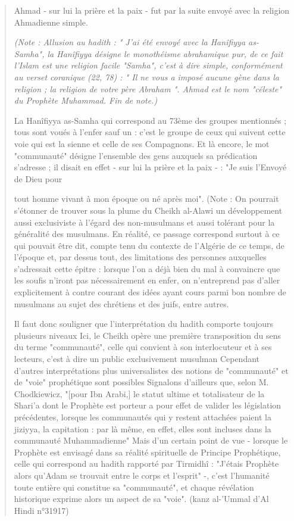 \begin{quote}
Ahmad - sur lui la prière et la paix - fut par la suite envoyé avec la
religion Ahmadienne simple.

\emph{(Note : Allusion au hadith : " J'ai été envoyé avec la Hanîfiyya
as- Samha", la Hanîfiyya désigne le monothéisme abrahamique pur, de ce
fait l'Islam est une religion facile "Samha", c'est à dire simple,
conformément au verset coranique (22, 78) : " Il ne vous a imposé aucune
gène dans la religion ; la religion de votre père Abraham ". Ahmad est
le nom "céleste" du Prophète Muhammad. Fin de note.)}

La Hanîfiyya as-Samha qui correspond au 73ème des groupes mentionnés ;
tous sont voués à l'enfer sauf un : c'est le groupe de ceux qui suivent
cette voie qui est la sienne et celle de ses Compagnons. Et là encore,
le mot "communauté" désigne l'ensemble des gens auxquels sa prédication
s'adresse ; il disait en effet - sur lui la prière et la paix - : "Je
suis l'Envoyé de Dieu pour

tout homme vivant à mon époque ou né après moi". (Note : On pourrait
s'étonner de trouver sous la plume du Cheikh al-Alawi un développement
aussi exclusiviste à l'égard des non-musulmans et aussi tolérant pour la
généralité des musulmans. En réalité, ce passage correspond surtout à ce
qui pouvait être dit, compte tenu du contexte de l'Algérie de ce temps,
de l'époque et, par dessus tout, des limitations des personnes
auxquelles s'adressait cette épitre : lorsque l'on a déjà bien du mal à
convaincre que les soufis n'iront pas nécessairement en enfer, on
n'entreprend pas d'aller explicitement à contre courant des idées ayant
cours parmi bon nombre de musulmans au sujet des chrétiens et des juifs,
entre autres.

Il faut donc souligner que l'interprétation du hadith comporte toujours
plusieurs niveaux Ici, le Cheikh opère une première transposition du
sens du terme "communauté", celle qui convient à son interlocuteur et à
ses lecteurs, c'est à dire un public exclusivement musulman Cependant
d'autres interprétations plus universalistes des notions de "communauté"
et de "voie" prophétique sont possibles Signalons d'ailleurs que, selon
M. Chodkiewicz, "{[}pour Ibn Arabi,{]} le statut ultime et totalisateur
de la Shari'a dont le Prophète est porteur a pour effet de valider les
législation précédentes, lorsque les communautés qui y restent attachées
paient la jiziyya, la capitation : par là même, en effet, elles sont
incluses dans la communauté Muhammadienne" Mais d'un certain point de
vue - lorsque le Prophète est envisagé dans sa réalité spirituelle de
Principe Prophétique, celle qui correspond au hadith rapporté par
Tirmidhî : "J'étais Prophète alors qu'Adam se trouvait entre le corps et
l'esprit" -, c'est l'humanité toute entière qui constitue sa
"communauté", et chaque révélation historique exprime alors un aspect de
sa "voie". (kanz al-'Ummal d'Al Hindi n°31917)


\end{quote}
